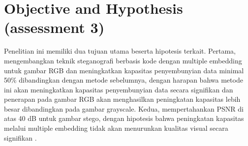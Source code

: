 \documentclass{ittelkom}
\begin{document}

\section{Objective and Hypothesis \color{red}(assessment 3)} \label{hyp}

Penelitian ini memiliki dua tujuan utama beserta hipotesis terkait. Pertama,
mengembangkan teknik steganografi berbasis kode dengan multiple embedding untuk
gambar RGB dan meningkatkan kapasitas penyembunyian data minimal 50\%
dibandingkan dengan metode sebelumnya, dengan harapan bahwa metode ini akan
meningkatkan kapasitas penyembunyian data secara signifikan dan penerapan pada
gambar RGB akan menghasilkan peningkatan kapasitas lebih besar dibandingkan
pada gambar grayscale. Kedua, mempertahankan PSNR di atas 40 dB untuk gambar
stego, dengan hipotesis bahwa peningkatan kapasitas melalui multiple embedding
tidak akan menurunkan kualitas visual secara signifikan
\cite{nasution2018image}.

\end{document}
